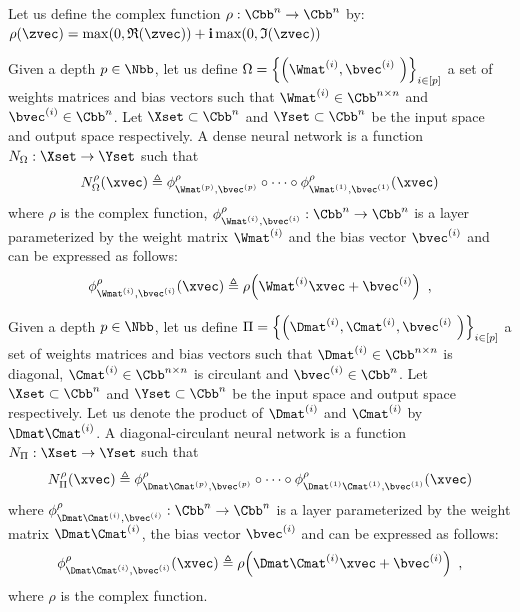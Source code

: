 \begin{definition} \label{definition:relu_function}
  Let us define the complex \relu function $\rho: \Cn \rightarrow \Cn$ by: $\rho(\zvec) = \max\left(0, \mathfrak{R}(\zvec)\right) + \ci \max\left(0, \mathfrak{I}(\zvec) \right)$
\end{definition}

\begin{definition}
  Given a depth $\depth \in \Nbb$,
  let us define $\Omega = \left\{ \left( \Wmat^{(i)}, \bvec^{(i)} \right) \right\}_{i \in [\depth]}$ a set of weights matrices and bias vectors 
  such that $\Wmat^{(i)} \in \Cnn$ and $\bvec^{(i)} \in \Cn$. 
  Let $\Xset \subset \Cn$ and $\Yset \subset \Cn$ be the input space and output space respectively. 
  A dense neural network is a function $\nn_\Omega: \Xset \rightarrow \Yset$ such that
  \begin{equation}
    \nn^\act_\Omega (\xvec) \triangleq \layer^\act_{\Wmat^{(\depth)}, \bvec^{(\depth)}} \circ \cdots \circ \layer^\act_{\Wmat^{(1)}, \bvec^{(1)}}(\xvec)
  \end{equation}
  where $\rho$ is the complex \relu function, $\layer^{\act}_{\Wmat^{(i)},\bvec^{(i)}}: \Cn \rightarrow \Cn$ is a layer parameterized by the weight matrix $\Wmat^{(i)}$ and the bias vector $\bvec^{(i)}$ and can be expressed as follows: 
  \begin{equation}
    \layer^{\act}_{\Wmat^{(i)},\bvec^{(i)}} (\xvec) \triangleq \act \left(\Wmat^{(i)}\xvec + \bvec^{(i)}\right) \enspace,
  \end{equation}
  \removespace
\end{definition}


\begin{definition}
  Given a depth $\depth \in \Nbb$,
  let us define $\Pi = \left\{ \left( \Dmat^{(i)}, \Cmat^{(i)}, \bvec^{(i)} \right) \right\}_{i \in [\depth]}$ a set of weights matrices and bias vectors 
  such that $\Dmat^{(i)} \in \Cnn$ is diagonal, $\Cmat^{(i)} \in \Cnn$ is circulant and $\bvec^{(i)} \in \Cn$. 
  Let $\Xset \subset \Cn$ and $\Yset \subset \Cn$ be the input space and output space respectively. 
  Let us denote the product of $\Dmat^{(i)}$ and $\Cmat^{(i)}$ by $\Dmat\Cmat^{(i)}$.
  A diagonal-circulant neural network is a function $\nn_\Pi: \Xset \rightarrow \Yset$ such that
  \begin{equation}
    \nn^\act_\Pi (\xvec) \triangleq \layer^\act_{\Dmat\Cmat^{(\depth)}, \bvec^{(\depth)}} \circ \cdots \circ \layer^\act_{\Dmat^{(1)}\Cmat^{(1)}, \bvec^{(1)}}(\xvec)
  \end{equation}
  where $\layer^{\act}_{\Dmat\Cmat^{(i)},\bvec^{(i)}}: \Cn \rightarrow \Cn$ is a layer parameterized by the weight matrix $\Dmat\Cmat^{(i)}$, the bias vector $\bvec^{(i)}$ and can be expressed as follows: 
  \begin{equation}
    \layer^{\act}_{\Dmat\Cmat^{(i)},\bvec^{(i)}} (\xvec) \triangleq \act \left(\Dmat\Cmat^{(i)}\xvec + \bvec^{(i)}\right) \enspace,
  \end{equation}
  where $\rho$ is the complex \relu function.
\end{definition}


